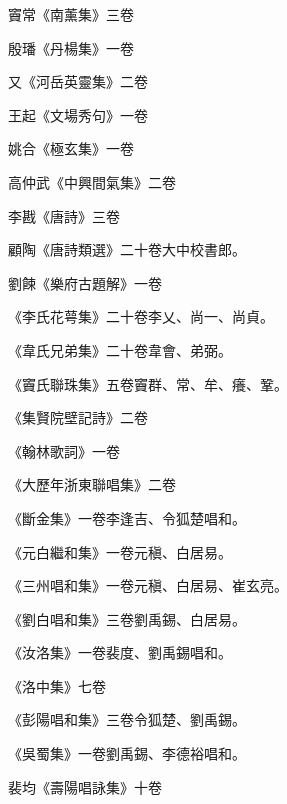 \begin{pinyinscope}
 竇常《南薰集》三卷



 殷璠《丹楊集》一卷



 又《河岳英靈集》二卷



 王起《文場秀句》一卷



 姚合《極玄集》一卷



 高仲武《中興間氣集》二卷



 李戡《唐詩》三卷



 顧陶《唐詩類選》二十卷大中校書郎。



 劉餗《樂府古題解》一卷



 《李氏花萼集》二十卷李乂、尚一、尚貞。



 《韋氏兄弟集》二十卷韋會、弟弼。



 《竇氏聯珠集》五卷竇群、常、牟、癢、鞏。



 《集賢院壁記詩》二卷



 《翰林歌詞》一卷



 《大歷年浙東聯唱集》二卷



 《斷金集》一卷李逢吉、令狐楚唱和。



 《元白繼和集》一卷元稹、白居易。



 《三州唱和集》一卷元稹、白居易、崔玄亮。



 《劉白唱和集》三卷劉禹錫、白居易。



 《汝洛集》一卷裴度、劉禹錫唱和。



 《洛中集》七卷



 《彭陽唱和集》三卷令狐楚、劉禹錫。



 《吳蜀集》一卷劉禹錫、李德裕唱和。



 裴均《壽陽唱詠集》十卷




\end{pinyinscope}
